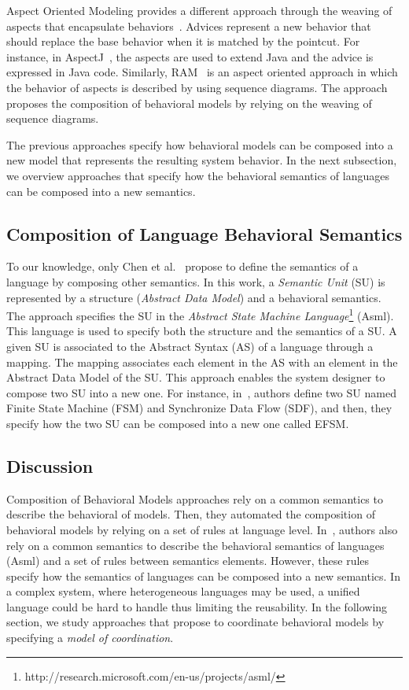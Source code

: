 Aspect Oriented Modeling provides a different approach through the weaving of aspects that encapsulate behaviors~\cite{weavingbib}. Advices represent a new behavior that should replace the base behavior when it is matched by the pointcut. For instance, in AspectJ~\cite{AspectJoverview}, the aspects are used to extend Java and the advice is expressed in Java code. Similarly, RAM~\cite{rambib,composdbib} is an aspect oriented approach in which the behavior of aspects is described by using sequence diagrams. The approach proposes the composition of behavioral models by relying on the weaving of sequence diagrams.

The previous approaches specify how behavioral models can be composed into a new model that represents the resulting system behavior. In the next subsection, we overview approaches that specify how the behavioral semantics of languages can be composed into a new semantics.

\subsection{Composition of Language Behavioral Semantics}
To our knowledge, only Chen et al.~\cite{semanticsanchoring} propose to define the semantics of a language by composing other semantics. In this work, a \emph{Semantic Unit} (SU) is represented by a structure (\emph{Abstract Data Model}) and a behavioral semantics. The approach specifies the SU in the \emph{Abstract State Machine Language}\footnote{http://research.microsoft.com/en-us/projects/asml/} (Asml). This language is used to specify both the structure and the semantics of a SU. A given SU is associated to the Abstract Syntax (AS) of a language through a mapping. The mapping associates each element in the AS with an element in the Abstract Data Model of the SU. This approach  enables the system designer to compose two SU into a new one. For instance, in~\cite{composemanticanch}, authors define two SU named Finite State Machine (FSM) and Synchronize Data Flow (SDF), and then, they specify how the two SU can be composed into a new one called EFSM.  

\subsection{Discussion}
Composition of Behavioral Models approaches rely on a common semantics to describe the behavioral of models. Then, they automated the composition of behavioral models by relying on a set of rules at language level. In~\cite{semanticsanchoring}, authors also rely on a common semantics to describe the behavioral semantics of languages (\eg Asml) and a set of rules between semantics elements. However, these rules specify how the semantics of languages can be composed into a new semantics. In a complex system, where heterogeneous languages may be used, a unified language could be hard to handle thus limiting the reusability.
In the following section, we study approaches that propose to coordinate behavioral models by specifying a \emph{model of coordination}.